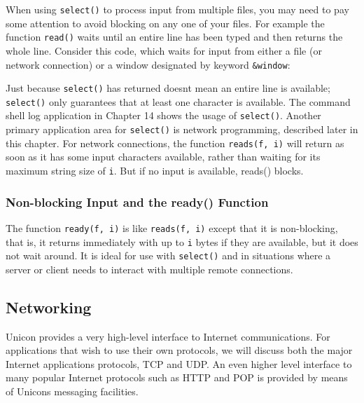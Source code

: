 When using \texttt{select()} to process input from multiple files, you
may need to pay some attention to avoid blocking on any one of your
files. For example the function \texttt{read()} waits until an entire
line has been typed and then returns the whole line. Consider this
code, which waits for input from either a file (or network connection)
or a window designated by keyword \texttt{\&window}:


Just because \texttt{select()} has returned doesn{\textquotesingle}t
mean an entire line is available; \texttt{select()} only guarantees
that at least one character is available. The command shell log
application in Chapter 14 shows the usage of \texttt{select()}. Another
primary application area for \texttt{select()} is network programming,
described later in this chapter. For network connections, the function
\texttt{reads(f, i)} will return as soon as it has some input
characters available, rather than waiting for its maximum string size
of \texttt{i}. But if no input is available, reads() blocks.

\subsubsection[Non{}-blocking Input and the ready()
Function]{Non-blocking Input and the \textrm{ready()} Function}
The function \texttt{ready(f, i)} is like \texttt{reads(f, i)} except
that it is non-blocking, that is, it returns immediately with up to
\texttt{i} bytes if they are available, but it does not wait around. It
is ideal for use with \texttt{select()} and in situations where a
server or client needs to interact with multiple remote connections.

\subsection[Networking]{Networking}
Unicon provides a very high-level interface to
Internet communications. For applications that wish to
use their own protocols, we will discuss both the major Internet
applications protocols, TCP and UDP. An even higher level
interface to many popular Internet protocols such as HTTP and POP is
provided by means of Unicon{\textquotesingle}s messaging facilities.

